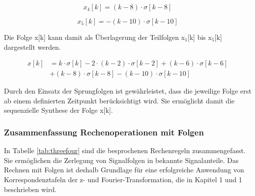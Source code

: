 \begin{equation}\label{eq:threefourtysix}
x_{4} \left[k\right]=\left(k-8\right)\cdot \sigma \left[k-8\right]
\end{equation}

\begin{equation}\label{eq:threefourtyseven}
x_{5} \left[k\right]=-\left(k-10\right)\cdot \sigma \left[k-10\right]
\end{equation}

\noindent Die Folge x[k] kann damit als \"{U}berlagerung der Teilfolgen x${}_{1}$[k] bis x${}_{5}$[k] dargestellt werden.

\begin{equation}\label{eq:threefourtyeight}
\begin{split}
x\left[k\right] & = k\cdot \sigma \left[k\right]-2\cdot \left(k-2\right)\cdot \sigma \left[k-2\right]+\left(k-6\right)\cdot \sigma \left[k-6\right] \\ 
& +\left(k-8\right)\cdot \sigma \left[k-8\right]-\left(k-10\right)\cdot \sigma \left[k-10\right]
\end{split}
\end{equation}

\noindent Durch den Einsatz der Sprungfolgen ist gew\"{a}hrleistet, dass die jeweilige Folge erst ab einem definierten Zeitpunkt ber\"{u}cksichtigt wird. Sie erm\"{o}glicht damit die sequenzielle Synthese der Folge x[k].

\subsubsection{Zusammenfassung Rechenoperationen mit Folgen}

\noindent In Tabelle \ref{tab:threefour} sind die besprochenen Rechenregeln zusammengefasst. Sie erm\"{o}glichen die Zerlegung von Signalfolgen in bekannte Signalanteile. Das Rechnen mit Folgen ist deshalb Grundlage f\"{u}r eine erfolgreiche Anwendung von Korrespondenztafeln der z- und Fourier-Transformation, die in Kapitel 1 und 1 beschrieben wird.

